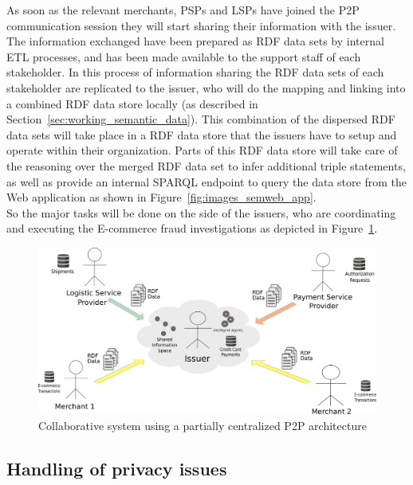 As soon as the relevant merchants, \gls{PSP}s and \gls{LSP}s have joined the \gls{P2P} communication session they will start sharing their information with the issuer. The information exchanged have been prepared as \gls{RDF} data sets by internal \gls{ETL} processes, and has been made available to the support staff of each stakeholder. In this process of information sharing the \gls{RDF} data sets of each stakeholder are replicated to the issuer, who will do the mapping and linking into a combined \gls{RDF} data store locally (as described in Section~\ref{sec:working_semantic_data}). This combination of the dispersed \gls{RDF} data sets will take place in a \gls{RDF} data store that the issuers have to setup and operate within their organization. Parts of this \gls{RDF} data store will take care of the reasoning over the merged \gls{RDF} data set to infer additional triple statements, as well as provide an internal \gls{SPARQL} endpoint to query the data store from the Web application as shown in Figure~\ref{fig:images_semweb_app}. \\

So the major tasks will be done on the side of the issuers, who are coordinating and executing the \gls{E-commerce} fraud investigations as depicted in Figure~\ref{fig:images_p2p_centralized}.\@

\begin{figure}[H]
	\centering
		\includegraphics[width=0.9\columnwidth]{images/system_P2P_centralized.pdf}
	\caption{Collaborative system using a partially centralized \gls{P2P} architecture}
\label{fig:images_p2p_centralized}
\end{figure}


\subsection{Handling of privacy issues}
\label{subsec:p2p_partially_issuer_privacy}

